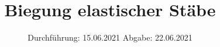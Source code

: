

\subject{103}
\title{Biegung elastischer Stäbe}
\date{%
  Durchführung: 15.06.2021
  \hspace{3em}
  Abgabe: 22.06.2021
}



\maketitle
\thispagestyle{empty}
\tableofcontents
\newpage



%
%



\printbibliography{}


